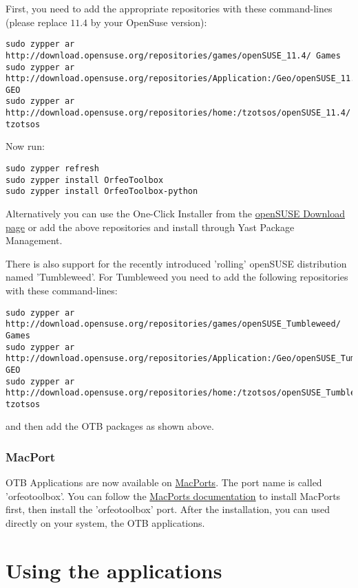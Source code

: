 First, you need to add the appropriate repositories with these command-lines (please replace $11.4$ by your OpenSuse version):
\begin{verbatim}
sudo zypper ar
http://download.opensuse.org/repositories/games/openSUSE_11.4/ Games
sudo zypper ar
http://download.opensuse.org/repositories/Application:/Geo/openSUSE_11.4/ GEO
sudo zypper ar
http://download.opensuse.org/repositories/home:/tzotsos/openSUSE_11.4/ tzotsos
\end{verbatim}

Now run:
\begin{verbatim}
sudo zypper refresh
sudo zypper install OrfeoToolbox
sudo zypper install OrfeoToolbox-python
\end{verbatim}

Alternatively you can use the One-Click Installer from the \href{http://software.opensuse.org/search?q=Orfeo&baseproject=openSUSE\%3A11.4&lang=en&include_home=true&exclude_debug=true}{openSUSE Download page} or add the above repositories and install through Yast Package Management.

There is also support for the recently introduced 'rolling' openSUSE distribution named 'Tumbleweed'.
For Tumbleweed you need to add the following repositories with these command-lines:
\begin{verbatim}
sudo zypper ar
http://download.opensuse.org/repositories/games/openSUSE_Tumbleweed/ Games
sudo zypper ar
http://download.opensuse.org/repositories/Application:/Geo/openSUSE_Tumbleweed/ GEO
sudo zypper ar
http://download.opensuse.org/repositories/home:/tzotsos/openSUSE_Tumbleweed/ tzotsos
\end{verbatim}
and then add the OTB packages as shown above.

\subsubsection{MacPort}

OTB Applications are now available on \href{http://http://www.macports.org/}{MacPorts}.
The port name is called 'orfeotoolbox'.
You can follow the \href{ http://guide.macports.org/}{MacPorts documentation} to install MacPorts first, then install the 'orfeotoolbox' port.
After the installation, you can used directly on your system, the OTB applications.

\section{Using the applications}\label{sec:usingapps}

